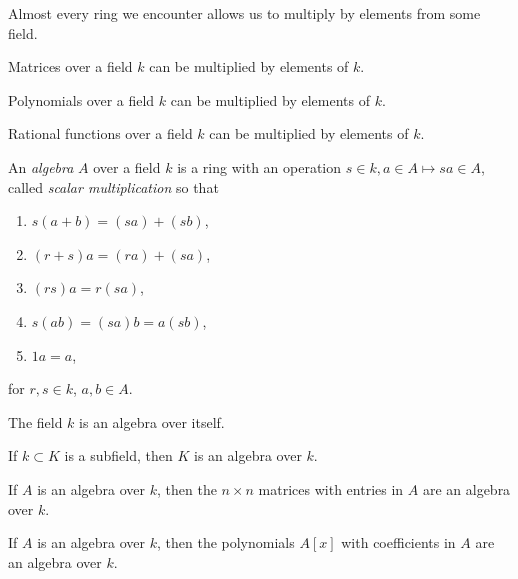 Almost every ring we encounter allows us to multiply by elements from some field.
\begin{example}
Matrices over a field \(k\) can be multiplied by elements of \(k\).
\end{example}
\begin{example}
Polynomials over a field \(k\) can be multiplied by elements of \(k\).
\end{example}
\begin{example}
Rational functions over a field \(k\) can be multiplied by elements of \(k\).
\end{example}
An \emph{algebra} \(A\) over a field \(k\) is a ring with an operation \(s \in k, a \in A \mapsto sa \in A\), called \emph{scalar multiplication} so that
\begin{enumerate}
\item \(s(a+b)=(sa)+(sb)\), 
\item \((r+s)a=(ra)+(sa)\), 
\item \((rs)a=r(sa)\), 
\item \(s(ab)=(sa)b=a(sb)\),
\item \(1a=a\),
\end{enumerate}
for \(r,s \in k\), \(a, b \in A\).

\begin{example}
The field \(k\) is an algebra over itself.
\end{example}
\begin{example}
If \(k \subset K\) is a subfield, then \(K\) is an algebra over \(k\).
\end{example}
\begin{example}
If \(A\) is an algebra over \(k\), then the \(n \times n\) matrices with entries in \(A\) are an algebra over \(k\).
\end{example}
\begin{example}
If \(A\) is an algebra over \(k\), then the polynomials \(A[x]\) with coefficients in \(A\) are an algebra over \(k\).
\end{example}



